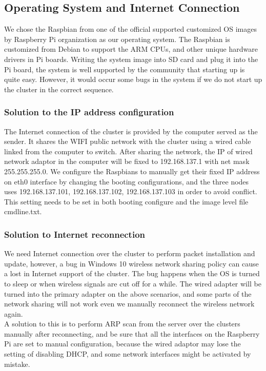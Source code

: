 \documentclass[11pt,openright,a4paper]{report}
\begin{document}
\subsection{Operating System and Internet Connection}
We chose the Raspbian from one of the official supported customized OS images by Raspberry Pi organization as our operating system. The Raspbian is customized from Debian to support the ARM CPUs, and other unique hardware drivers in Pi boards\cite{harrington2015learning}. Writing the system image into SD card and plug it into the Pi board, the system is well supported by the community that starting up is quite easy. However, it would occur some bugs in the system if we do not start up the cluster in the correct sequence.\\
\subsubsection{Solution to the IP address configuration}
 The Internet connection of the cluster is provided by the computer served as the sender. It shares the WIFI public network with the cluster using a wired cable linked from the computer to switch. After sharing the network, the IP of wired network adaptor in the computer will be fixed to 192.168.137.1 with net mask 255.255.255.0. We configure the Raspbians to manually get their fixed IP address on eth0 interface by changing the booting configurations, and the three nodes uses 192.168.137.101, 192.168.137.102, 192.168.137.103 in order to avoid conflict. This setting needs to be set in both booting configure and the image level file cmdline.txt.\\
 \subsubsection{Solution to Internet reconnection}
 We need Internet connection over the cluster to perform packet installation and update, however, a bug in Windows 10 wireless network sharing policy can cause a lost in Internet support of the cluster. The bug happens when the OS is turned to sleep or when wireless signals are cut off for a while. The wired adapter will be turned into the primary adapter on the above scenarios, and some parts of the network sharing will not work even we manually reconnect the wireless network again.\\
 A solution to this is to perform ARP scan from the server over the clusters manually after reconnecting, and be sure that all the interfaces on the Raspberry Pi are set to manual configuration, because the wired adaptor may lose the setting of disabling DHCP, and some network interfaces might be activated by mistake.\\
\end{document}
